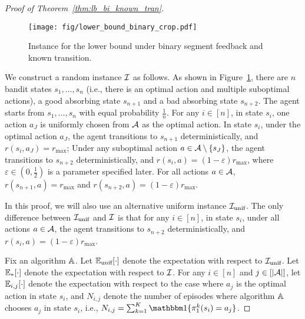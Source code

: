 \begin{proof}[Proof of Theorem~\ref{thm:lb_bi_known_tran}]
	\begin{figure}[t]
		\centering   
		\texttt{[image: fig/lower\_bound\_binary\_crop.pdf]}
		\caption{Instance for the lower bound under binary segment feedback and known transition.
		} \label{fig:lower_bound_binary}
	\end{figure}
	
	We construct a random instance $\mathcal{I}$ as follows. As shown in Figure~\ref{fig:lower_bound_binary}, there are $n$ bandit states $s_1,\dots,s_n$ (i.e., there is an optimal action and multiple suboptimal actions), a good absorbing state $s_{n+1}$ and a bad absorbing state $s_{n+2}$. 
	The agent starts from $s_1,\dots,s_n$ with equal probability $\frac{1}{n}$. 
	For any $i \in [n]$, in state $s_i$, one action $a_J$ is uniformly chosen from $\mathcal{A}$ as the optimal action.
	In state $s_i$, under the optimal action $a_J$, the agent transitions to $s_{n+1}$ deterministically, and $r(s_i,a_J)=r_{\max}$; Under any suboptimal action $a \in \mathcal{A} \setminus \{s_J\}$, the agent transitions to $s_{n+2}$ deterministically, and $r(s_i,a)=(1-\varepsilon)r_{\max}$, where $\varepsilon \in (0,\frac{1}{2})$ is a parameter specified later. 
	For all actions $a \in \mathcal{A}$, $r(s_{n+1},a)=r_{\max}$ and $r(s_{n+2},a)=(1-\varepsilon)r_{\max}$.
	
	
	In this proof, we will also use an alternative uniform instance $\mathcal{I}_{\textup{unif}}$. The only difference between $\mathcal{I}_{\textup{unif}}$ and $\mathcal{I}$ is that for any $i \in [n]$, in state $s_i$, under all actions $a \in \mathcal{A}$, the agent transitions to $s_{n+2}$ deterministically, and $r(s_i,a)=(1-\varepsilon)r_{\max}$.
	
	Fix an algorithm $\mathbb{A}$.
	Let $\mathbb{E}_{\textup{unif}}[\cdot]$ denote the expectation with respect to $\mathcal{I}_{\textup{unif}}$. Let $\mathbb{E}_*[\cdot]$ denote the expectation with respect to $\mathcal{I}$. For any $i \in [n]$ and $j \in [|\mathcal{A}|]$, let $\mathbb{E}_{i,j}[\cdot]$ denote the expectation with respect to the case where $a_j$ is the optimal action in state $s_i$, and  $N_{i,j}$ denote the number of episodes where algorithm $\mathbb{A}$ chooses $a_j$ in state $s_i$, i.e., $N_{i,j}=\sum_{k=1}^{K} \indicator\{\pi^k_1(s_i)=a_j\}$. 
	

\end{proof}

